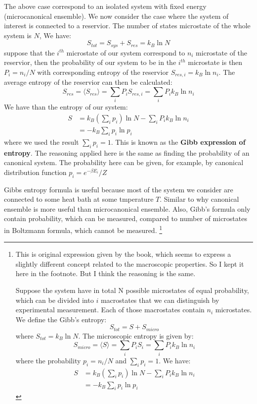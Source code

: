\documentclass{article}
\begin{document}
The above case correspond to an isolated system with fixed energy (microcanonical ensemble). We now
consider the case where the system of interest is connected to a reservior. 
The number of states microstate of the whole system is $N$, We have:
\begin{equation}
    S_{tot} = S_{sys} + S_{res} = k_B \ln N
\end{equation}
suppose that the $i^{th}$ microstate of our system correspond to $n_i$ microstate of the reservior,
then the probability of our system to be in the $i^{th}$ microstate is then $P_i = n_i / N$
with corresponding entropy of the reservior $S_{res,i} = k_B \ln n_i$. The average entropy 
of the reservior can then be calculated:
\begin{equation}
    S_{res} = \langle S_{res} \rangle = \sum_i P_i S_{res,i} = \sum_i P_i k_B\ln n_i
\end{equation}
We have than the entropy of our system:
\begin{align}
    S & = k_B \left(\sum_i p_i\right) \ln N - \sum_i P_i k_B\ln n_i \\
    & = - k_B \sum_i p_i \ln p_i
\end{align}
where we used the result $\sum_i p_i = 1$. This is known as the \textbf{Gibb expression of entropy}.
The reasoning applied here is the same as finding the probability of an canonical system. 
The probability here can be given, for example, by canonical distribution function $p_i = e^{-\beta E_i} / Z$

Gibbs entropy formula is useful because most of the system we consider are connected to some 
heat bath at some tmperature $T$. Similar to why canonical ensemble is more useful than microcanonical 
ensemble. 
Also, Gibb's formula only contain probability, which can be measured, compared to number of microstates
in Boltzmann formula, which cannot be measured.
\footnote{
This is original expression given by the book, which seems to express a slightly different concept
related to the macroscopic properties. So I kept it here in the footnote. But I think the reasoning 
is the same.

Suppose the system 
have in total N possible microstates of equal probability, 
which can be divided into $i$ macrostates that we can distinguish by experimental measurement.
Each of those macrostates contain $n_i$ microstates. We define the Gibb's entropy:
\begin{equation}
    S_{tot} = S + S_{micro}
\end{equation}
where $ S_{tot} = k_B \ln N$. The microscopic entropy is given by:
\begin{equation}
    S_{micro} = \langle S \rangle = \sum_i P_i S_i = \sum_i P_i k_B\ln n_i
\end{equation}
where the probability $p_i = n_i / N$ and $\sum_i p_i = 1$. We have:
\begin{align}
    S & = k_B \left(\sum_i p_i\right) \ln N - \sum_i P_i k_B\ln n_i \\
    & = - k_B \sum_i p_i \ln p_i
\end{align}
}
\end{document}
